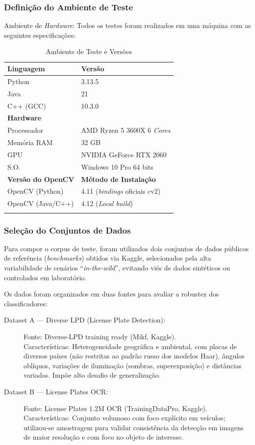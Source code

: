 \subsubsection{Definição do Ambiente de Teste}
Ambiente de \textit{Hardware}: Todos os testes foram realizados em uma máquina com as seguintes especificações:
\begin{table}[h]
\centering
\caption{Ambiente de Teste e Versões}
\begin{tabular}{l l}
\hline
\textbf{Linguagem} & \textbf{Versão} \\
\hline
Python & 3.13.5 \\
Java & 21 \\
C++ (GCC) & 10.3.0 \\
\hline
\multicolumn{2}{l}{\textbf{Hardware}} \\
\hline
Processador & AMD Ryzen 5 3600X 6 \textit{Cores} \\
Memória RAM & 32 GB \\
GPU & NVIDIA GeForce RTX 2060\\
S.O. & Windows 10 Pro 64 bits \\
\hline
\textbf{Versão do OpenCV} & \textbf{Método de Instalação} \\
\hline
OpenCV (Python) & 4.11 (\textit{bindings} oficiais cv2) \\
OpenCV (Java/C++) & 4.12 (\textit{Local build}) \\
\label{tab:ambiente_teste}
\end{tabular}
\end{table}

\subsubsection{Seleção do Conjuntos de Dados}
Para compor o corpus de teste, foram utilizados dois conjuntos de dados públicos de referência (\textit{benchmarks}) obtidos via Kaggle, selecionados pela alta variabilidade de cenários “\textit{in-the-wild}”, evitando viés de dados sintéticos ou controlados em laboratório.

Os dados foram organizados em duas fontes para avaliar a robustez dos classificadores:

\begin{description}
    \item[Dataset A — Diverse LPD (License Plate Detection):]
    Fonte: Diverse-LPD training ready (Mikf, Kaggle).\\
    Características: Heterogeneidade geográfica e ambiental, com placas de diversos países (não restritas ao padrão russo dos modelos Haar), ângulos oblíquos, variações de iluminação (sombras, superexposição) e distâncias variadas. Impõe alto desafio de generalização.

    \item[Dataset B — License Plates OCR:]
    Fonte: License Plates 1.2M OCR (TrainingDataPro, Kaggle).\\
    Características: Conjunto volumoso com foco explícito em veículos; utilizou-se amostragem para validar consistência da detecção em imagens de maior resolução e com foco no objeto de interesse.
\end{description}

